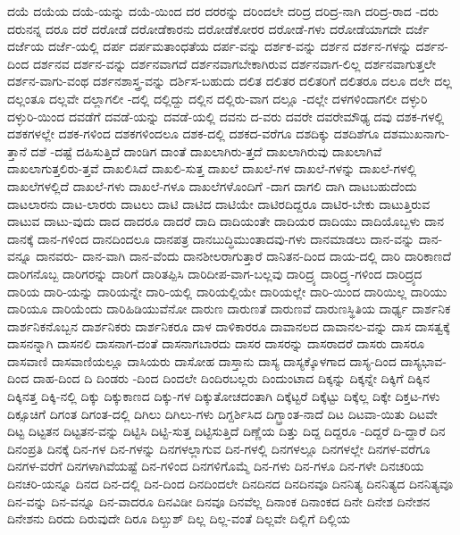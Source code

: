 {ದಯೆ
ದಯೆಯ
ದಯೆ-ಯನ್ನು
ದಯೆ-ಯಿಂದ
ದರ
ದರರನ್ನು
ದರಿಂದಲೇ
ದರಿದ್ರ
ದರಿದ್ರ-ನಾಗಿ
ದರಿದ್ರ-ರಾದ
-ದರು
ದರುನನ್ನ
ದರೂ
ದರೆ
ದರೋಡೆ
ದರೋಡೆಕಾರನು
ದರೋಡೆಕೋರರ
ದರೋಡೆ-ಗಳು
ದರೋಡೆಯಾಗದೇ
ದರ್ಜೆ
ದರ್ಜೆಯ
ದರ್ಜೆ-ಯಲ್ಲಿ
ದರ್ಪ
ದರ್ಪಮತಾಂಧತೆಯ
ದರ್ಪ-ವನ್ನು
ದರ್ಶಕ-ವನ್ನು
ದರ್ಶನ
ದರ್ಶನ-ಗಳನ್ನು
ದರ್ಶನ-ದಿಂದ
ದರ್ಶನವ
ದರ್ಶನ-ವನ್ನು
ದರ್ಶನವಾಗದೆ
ದರ್ಶನವಾಗಬೇಕಾಗಿರುವ
ದರ್ಶನವಾಗ-ಲಿಲ್ಲ
ದರ್ಶನವಾಗುತ್ತಲೇ
ದರ್ಶನ-ವಾಗು-ವಂಥ
ದರ್ಶನಶಾಸ್ತ್ರ-ವನ್ನು
ದರ್ಶಿಸ-ಬಹುದು
ದಲಿತ
ದಲಿತರ
ದಲಿತರಿಗೆ
ದಲಿತರೂ
ದಲೂ
ದಲೇ
ದಲ್ಲ
ದಲ್ಲಂತೂ
ದಲ್ಲವೇ
ದಲ್ಲಾಗಲೀ
-ದಲ್ಲಿ
ದಲ್ಲಿದ್ದು
ದಲ್ಲಿನ
ದಲ್ಲಿರು-ವಾಗ
ದಲ್ಲೂ
-ದಲ್ಲೇ
ದಳಗಳಿಂದಾಗಲೀ
ದಳ್ಳುರಿ
ದಳ್ಳುರಿ-ಯಿಂದ
ದವಡೆಗೆ
ದವಡೆ-ಯನ್ನು
ದವಡೆ-ಯಲ್ಲಿ
ದವನು
ದ-ವರು
ದವರೇ
ದವರೇಮೌಢ್ಯ
ದವು
ದಶಕ-ಗಳಲ್ಲಿ
ದಶಕಗಳಲ್ಲೇ
ದಶಕ-ಗಳಿಂದ
ದಶಕಗಳಿಂದಲೂ
ದಶಕ-ದಲ್ಲಿ
ದಶಕದ-ವರೆಗೂ
ದಶದಿಕ್ಕು
ದಶದಿಶೆಗೂ
ದಶಮುಖನಾಗು-ತ್ತಾನೆ
ದಶೆ
-ದಷ್ಟೆ
ದಹಿಸುತ್ತಿದೆ
ದಾಂಡಿಗ
ದಾಂತೆ
ದಾಖಲಾಗಿರು-ತ್ತದೆ
ದಾಖಲಾಗಿರುವು
ದಾಖಲಾಗಿವೆ
ದಾಖಲಾಗುತ್ತಲಿರು-ತ್ತವೆ
ದಾಖಲಿಸಿದೆ
ದಾಖಲಿ-ಸುತ್ತ
ದಾಖಲೆ
ದಾಖಲೆ-ಗಳ
ದಾಖಲೆ-ಗಳನ್ನು
ದಾಖಲೆ-ಗಳಲ್ಲಿ
ದಾಖಲೆಗಳಲ್ಲಿದೆ
ದಾಖಲೆ-ಗಳು
ದಾಖಲೆ-ಗಳೂ
ದಾಖಲೆಗಳೊಂದಿಗೆ
-ದಾಗ
ದಾಗಲಿ
ದಾಗಿ
ದಾಟಬಹುದೆಂದು
ದಾಟಲಾರನು
ದಾಟ-ಲಾರರು
ದಾಟಲು
ದಾಟಿ
ದಾಟಿದ
ದಾಟಿಯೇ
ದಾಟಿರದಿದ್ದರೂ
ದಾಟಿರ-ಬೇಕು
ದಾಟುತ್ತಿರುವ
ದಾಟುವ
ದಾಟು-ವುದು
ದಾದ
ದಾದರೂ
ದಾದರೆ
ದಾದಿ
ದಾದಿಯಂತೇ
ದಾದಿಯರ
ದಾದಿಯು
ದಾದಿಯೊಬ್ಬಳು
ದಾನ
ದಾನಕ್ಕೆ
ದಾನ-ಗಳಿಂದ
ದಾನದಿಂದಲೂ
ದಾನಪತ್ರ
ದಾನಬುದ್ಧಿಮುಂತಾದವು-ಗಳು
ದಾನಮಾಡಲು
ದಾನ-ವನ್ನು
ದಾನ-ವನ್ನೂ
ದಾನವರು-
ದಾನ-ವಾಗಿ
ದಾನ-ವೆಂದು
ದಾನಶೀಲರಾಗುತ್ತಾರೆ
ದಾನಿತನ-ದಿಂದ
ದಾಯ-ದಲ್ಲಿ
ದಾರಿ
ದಾರಿಕಾಣದೆ
ದಾರಿಗನೊಬ್ಬ
ದಾರಿಗರನ್ನು
ದಾರಿಗೆ
ದಾರಿತಪ್ಪಿಸಿ
ದಾರಿದೀಪ-ವಾಗ-ಬಲ್ಲವು
ದಾರಿದ್ರ್ಯ
ದಾರಿದ್ರ್ಯ-ಗಳಿಂದ
ದಾರಿದ್ರ್ಯದ
ದಾರಿಯ
ದಾರಿ-ಯನ್ನು
ದಾರಿಯನ್ನೇ
ದಾರಿ-ಯಲ್ಲಿ
ದಾರಿಯಲ್ಲಿಯೇ
ದಾರಿಯಲ್ಲೇ
ದಾರಿ-ಯಿಂದ
ದಾರಿಯಿಲ್ಲ
ದಾರಿಯು
ದಾರಿಯೂ
ದಾರಿಯೆಂದು
ದಾರಿಹಿಡಿಯುವೆನೋ
ದಾರುಣ
ದಾರುಣತೆ
ದಾರುಣವೆ
ದಾರುಣಸ್ಥಿತಿಯ
ದಾರ್ಢ್ಯ
ದಾರ್ಶನಿಕ
ದಾರ್ಶನಿಕನೊಬ್ಬನ
ದಾರ್ಶನಿಕರು
ದಾರ್ಶನಿಕರೂ
ದಾಳ
ದಾಳಿಕಾರರೂ
ದಾವಾನಲದ
ದಾವಾನಲ-ವನ್ನು
ದಾಸ
ದಾಸತ್ವಕ್ಕೆ
ದಾಸನನ್ನಾಗಿ
ದಾಸನಲಿ
ದಾಸನಾಗ-ದಂತೆ
ದಾಸನಾಗಬಾರದು
ದಾಸರ
ದಾಸರನ್ನು
ದಾಸರಾದರೆ
ದಾಸರು
ದಾಸರೂ
ದಾಸವಾಣಿ
ದಾಸವಾಣಿಯಲ್ಲೂ
ದಾಸಿಯರು
ದಾಸೋಹ
ದಾಸ್ತಾನು
ದಾಸ್ಯ
ದಾಸ್ಯಕ್ಕೊಳಗಾದ
ದಾಸ್ಯ-ದಿಂದ
ದಾಸ್ಯಭಾವ-ದಿಂದ
ದಾಹ-ದಿಂದ
ದಿ
ದಿಂಡರು
-ದಿಂದ
ದಿಂದಲೇ
ದಿಂದಿರಬಲ್ಲರು
ದಿಂದುಂಟಾದ
ದಿಕ್ಕನ್ನು
ದಿಕ್ಕನ್ನೇ
ದಿಕ್ಕಿಗೆ
ದಿಕ್ಕಿನ
ದಿಕ್ಕಿನತ್ತ
ದಿಕ್ಕಿ-ನಲ್ಲಿ
ದಿಕ್ಕು
ದಿಕ್ಕುಕಾಣದ
ದಿಕ್ಕು-ಗಳ
ದಿಕ್ಕುತೋಚದಂತಾಗಿ
ದಿಕ್ಕೆಟ್ಟರೆ
ದಿಕ್ಕೆಟ್ಟು
ದಿಕ್ಕೆಲ್ಲ
ದಿಕ್ಕೇ
ದಿಕ್ತಟ-ಗಳು
ದಿಕ್ಸೂಚಿಗೆ
ದಿಗಂತ
ದಿಗಂತ-ದಲ್ಲಿ
ದಿಗಿಲು
ದಿಗಿಲು-ಗಳು
ದಿಗ್ದರ್ಶಿಸಿದ
ದಿಗ್ಭ್ರಾಂತ-ನಾದೆ
ದಿಟ
ದಿಟವಾ-ಯಿತು
ದಿಟವೇ
ದಿಟ್ಟ
ದಿಟ್ಟತನ
ದಿಟ್ಟತನ-ವನ್ನು
ದಿಟ್ಟಿಸಿ
ದಿಟ್ಟಿ-ಸುತ್ತ
ದಿಟ್ಟಿಸುತ್ತಿದೆ
ದಿಣ್ಣೆಯ
ದಿತ್ತು
ದಿದ್ದ
ದಿದ್ದರೂ
-ದಿದ್ದರೆ
ದಿ-ದ್ದಾರೆ
ದಿನ
ದಿನಂಪ್ರತಿ
ದಿನಕ್ಕೆ
ದಿನ-ಗಳ
ದಿನ-ಗಳನ್ನು
ದಿನಗಳಲ್ಲಾಗುವ
ದಿನ-ಗಳಲ್ಲಿ
ದಿನಗಳಲ್ಲೂ
ದಿನಗಳಲ್ಲೇ
ದಿನಗಳ-ವರೆಗೂ
ದಿನಗಳ-ವರೆಗೆ
ದಿನಗಳಾಗಿವೆಯಷ್ಟೆ
ದಿನ-ಗಳಿಂದ
ದಿನಗಳಿಗೊಮ್ಮೆ
ದಿನ-ಗಳು
ದಿನ-ಗಳೂ
ದಿನ-ಗಳೇ
ದಿನಚರಿಯ
ದಿನಚರಿ-ಯನ್ನೂ
ದಿನದ
ದಿನ-ದಲ್ಲಿ
ದಿನ-ದಿಂದ
ದಿನದಿಂದಲೇ
ದಿನದಿನದ
ದಿನದಿನವೂ
ದಿನನಿತ್ಯ
ದಿನನಿತ್ಯದ
ದಿನನಿತ್ಯವೂ
ದಿನ-ವನ್ನು
ದಿನ-ವನ್ನೂ
ದಿನ-ವಾದರೂ
ದಿನವಿಡೀ
ದಿನವೂ
ದಿನವೆಲ್ಲ
ದಿನಾಂಕ
ದಿನಾಂಕದ
ದಿನೇ
ದಿನೇಶ
ದಿನೇಶನ
ದಿನೇಶನು
ದಿರದು
ದಿರುವುದೇ
ದಿರೂ
ದಿಲ್ಖುಶ್
ದಿಲ್ಲ
ದಿಲ್ಲ-ವಂತೆ
ದಿಲ್ಲವೇ
ದಿಲ್ಲಿಗೆ
ದಿಲ್ಲಿಯ
}
